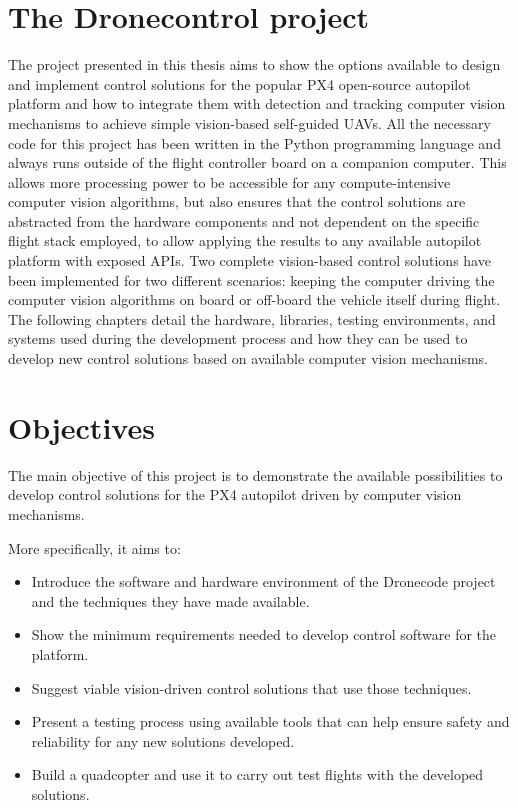 \section{The Dronecontrol project}

The project presented in this thesis aims to show the options available to design and implement control solutions for the popular PX4 open-source autopilot platform and how to integrate them with detection and tracking computer vision mechanisms to achieve simple vision-based self-guided UAVs.
All the necessary code for this project has been written in the Python programming language and always runs outside of the flight controller board on a companion computer.
This allows more processing power to be accessible for any compute-intensive computer vision algorithms,
but also ensures that the control solutions are abstracted from the hardware components and not dependent on the specific flight stack employed, 
to allow applying the results to any available autopilot platform with exposed APIs.
Two complete vision-based control solutions have been implemented for two different scenarios: keeping the computer driving the computer vision algorithms on board or off-board the vehicle itself during flight.
The following chapters detail the hardware, libraries, testing environments, and systems used during the development process and how they can be used to develop new control solutions based on available computer vision mechanisms.



\section{Objectives}
\label{sec:objetives}

The main objective of this project is to demonstrate the available possibilities to develop control solutions for the PX4 autopilot driven by computer vision mechanisms.

More specifically, it aims to:
\begin{itemize}
    \item Introduce the software and hardware environment of the Dronecode project and the techniques they have made available.
    \item Show the minimum requirements needed to develop control software for the platform.
    \item Suggest viable vision-driven control solutions that use those techniques.
    \item Present a testing process using available tools that can help ensure safety and reliability for any new solutions developed.
    \item Build a quadcopter and use it to carry out test flights with the developed solutions.
\end{itemize}


